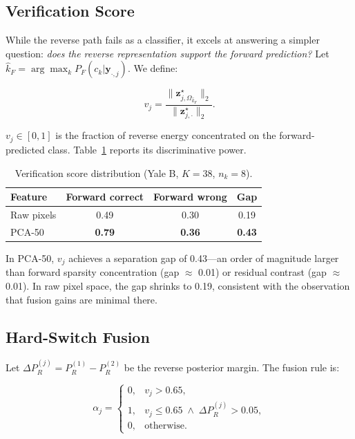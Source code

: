 \documentclass[10pt,comsoc]{IEEEtran}
\begin{document}
\subsection{Verification Score}

While the reverse path fails as a classifier, it excels at answering a simpler question: \emph{does the reverse representation support the forward prediction?} Let $\hat{k}_F = \arg\max_k P_F(c_k|\mathbf{y}_{\cdot,j})$. We define:

\begin{equation}
\label{eq:verif}
v_j = \frac{\|\mathbf{z}_{j, \Omega_{\hat{k}_F}}^\star\|_2}{\|\mathbf{z}_{j,\cdot}^\star\|_2}.
\end{equation}

$v_j \in [0,1]$ is the fraction of reverse energy concentrated on the forward-predicted class. Table~\ref{tab:verif_gap} reports its discriminative power.

\begin{table}[t]
\centering
\caption{Verification score distribution (Yale B, $K=38$, $n_k=8$).}
\label{tab:verif_gap}
\begin{tabular}{lccc}
\hline
\textbf{Feature} & \textbf{Forward correct} & \textbf{Forward wrong} & \textbf{Gap} \\ \hline
Raw pixels & 0.49 & 0.30 & 0.19 \\
PCA-50 & \textbf{0.79} & \textbf{0.36} & \textbf{0.43} \\ \hline
\end{tabular}
\end{table}

In PCA-50, $v_j$ achieves a separation gap of 0.43---an order of magnitude larger than forward sparsity concentration (gap $\approx$ 0.01) or residual contrast (gap $\approx$ 0.01). In raw pixel space, the gap shrinks to 0.19, consistent with the observation that fusion gains are minimal there.

\subsection{Hard-Switch Fusion}

Let $\Delta P_R^{(j)} = P_R^{(1)} - P_R^{(2)}$ be the reverse posterior margin. The fusion rule is:

\begin{equation}
\label{eq:hard_fusion}
\alpha_j = \begin{cases}
0, & v_j > 0.65,\\
1, & v_j \leq 0.65 \;\land\; \Delta P_R^{(j)} > 0.05,\\
0, & \text{otherwise}.
\end{cases}
\end{equation}
\end{document}
